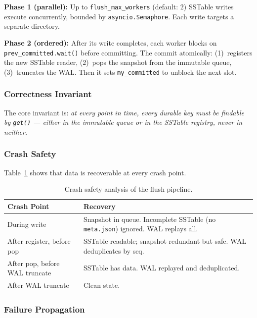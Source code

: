 \documentclass[conference]{IEEEtran}
\begin{document}
\textbf{Phase 1 (parallel):} Up to \texttt{flush\_max\_workers} (default: 2) SSTable writes execute concurrently, bounded by \texttt{asyncio.Semaphore}. Each write targets a separate directory.

\textbf{Phase 2 (ordered):} After its write completes, each worker blocks on \texttt{prev\_committed.wait()} before committing. The commit atomically: (1)~registers the new SSTable reader, (2)~pops the snapshot from the immutable queue, (3)~truncates the WAL. Then it sets \texttt{my\_committed} to unblock the next slot.

\subsubsection{Correctness Invariant}

The core invariant is: \textit{at every point in time, every durable key must be findable by \texttt{get()} --- either in the immutable queue or in the SSTable registry, never in neither.}

\subsubsection{Crash Safety}

Table~\ref{tab:crash-safety} shows that data is recoverable at every crash point.

\begin{table}[t]
\centering
\caption{Crash safety analysis of the flush pipeline.}
\label{tab:crash-safety}
\begin{tabular}{@{}lp{5.2cm}@{}}
\toprule
\textbf{Crash Point} & \textbf{Recovery} \\
\midrule
During write & Snapshot in queue. Incomplete SSTable (no \texttt{meta.json}) ignored. WAL replays all. \\
After register, before pop & SSTable readable; snapshot redundant but safe. WAL deduplicates by seq. \\
After pop, before WAL truncate & SSTable has data. WAL replayed and deduplicated. \\
After WAL truncate & Clean state. \\
\bottomrule
\end{tabular}
\end{table}

\subsubsection{Failure Propagation}
\end{document}

